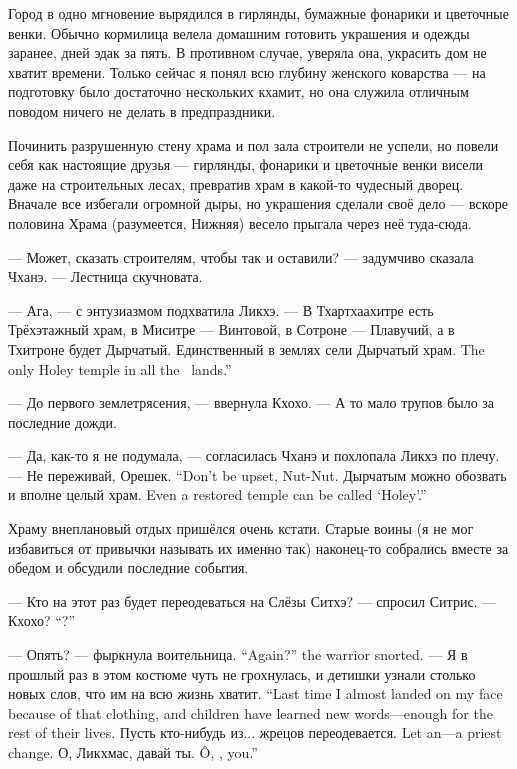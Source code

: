 Город в одно мгновение вырядился в гирлянды, бумажные фонарики и цветочные венки.
Обычно кормилица велела домашним готовить украшения и одежды заранее, дней эдак за пять.
В противном случае, уверяла она, украсить дом не хватит времени.
Только сейчас я понял всю глубину женского коварства --- на подготовку было достаточно нескольких кхамит, но она служила отличным поводом ничего не делать в предпраздники.

Починить разрушенную стену храма и пол зала строители не успели, но повели себя как настоящие друзья --- гирлянды, фонарики и цветочные венки висели даже на строительных лесах, превратив храм в какой-то чудесный дворец.
Вначале все избегали огромной дыры, но украшения сделали своё дело --- вскоре половина Храма (разумеется, Нижняя) весело прыгала через неё туда-сюда.

--- Может, сказать строителям, чтобы так и оставили? --- задумчиво сказала Чханэ.
--- Лестница скучновата.

--- Ага, --- с энтузиазмом подхватила Ликхэ.
--- В Тхартхаахитре есть Трёхэтажный храм, в Миситре --- Винтовой\FM, в Сотроне --- Плавучий, а в Тхитроне будет Дырчатый.
{Единственный в землях сели Дырчатый храм.}
{The only Holey temple in all the \Seli\ lands.''}

--- До первого землетрясения, --- ввернула Кхохо.
--- А то мало трупов было за последние дожди.

--- Да, как-то я не подумала, --- согласилась Чханэ и похлопала Ликхэ по плечу.
{--- Не переживай, Орешек.}
{``Don't be upset, Nut-Nut.}
{Дырчатым можно обозвать и вполне целый храм.}
{Even a restored temple can be called `Holey'.''}

Храму внеплановый отдых пришёлся очень кстати.
Старые воины (я не мог избавиться от привычки называть их именно так) наконец-то собрались вместе за обедом и обсудили последние события.

--- Кто на этот раз будет переодеваться на Слёзы Ситхэ? --- спросил Ситрис.
{--- Кхохо?}
{``\Kchoho?''}

{--- Опять? --- фыркнула воительница.}
{``Again?'' the warrior snorted.}
{--- Я в прошлый раз в этом костюме чуть не грохнулась, и детишки узнали столько новых слов, что им на всю жизнь хватит.}
{``Last time I almost landed on my face because of that clothing, and children have learned new words---enough for the rest of their lives.}
{Пусть кто-нибудь из... жрецов переодевается.}
{Let an---a priest change.}
{О, Ликхмас, давай ты.}
{\^{O}, \Likchmas, you.''}

